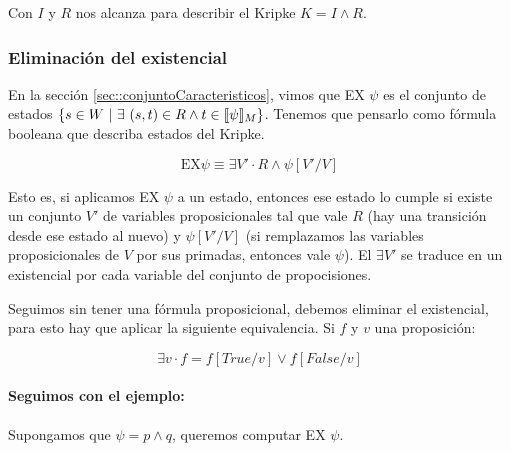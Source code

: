 Con $I$ y $R$ nos alcanza para describir el Kripke $K = I \land R$.

\subsubsection{Eliminación del existencial}
En la sección \ref{sec::conjuntoCaracteristicos}, vimos que EX $\psi$ es el conjunto de estados $\{s\in W~|~\exists~(s,t)\in R \land t\in\llbracket \psi \rrbracket_{M}\}$. Tenemos que pensarlo como fórmula booleana que describa estados del Kripke.

$$\text{EX} \psi \equiv \exists V' \cdot R \land \psi[V' / V]$$

Esto es, si aplicamos EX $\psi$ a un estado, entonces ese estado lo cumple si existe un conjunto $V'$ de variables proposicionales tal que vale $R$ (hay una transición desde ese estado al nuevo) y $\psi[V' / V]$ (si remplazamos las variables proposicionales de $V$ por sus primadas, entonces vale $\psi$). El $\exists V'$ se traduce en un existencial por cada variable del conjunto de propocisiones.

Seguimos sin tener una fórmula proposicional, debemos eliminar el existencial, para esto hay que aplicar la siguiente equivalencia. Si $f$ y $v$ una proposición:

$$\exists v \cdot f = f[True/v] \lor f[False/v]$$


\paragraph{Seguimos con el ejemplo:} Supongamos que $\psi = p \land q$, queremos computar EX $\psi$.


